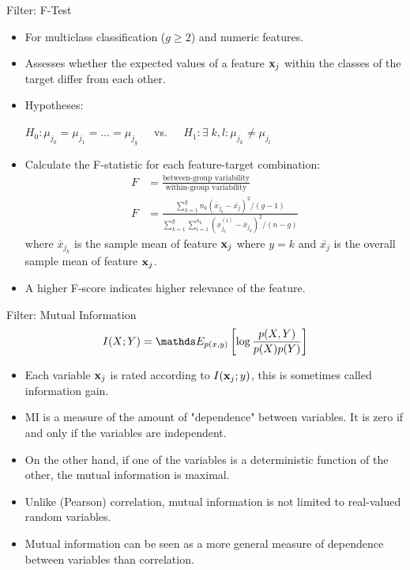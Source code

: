 \begin{vbframe}{Filter: F-Test}
\begin{itemize}
  \item For multiclass classification ($g \ge 2$) and numeric features.
  \item Assesses whether the expected values of a feature $\mathbf{x}_j$ within the classes of the target differ from each other.
  \item Hypotheses:

  $H_0: \mu_{j_0} = \mu_{j_1} = \dots = \mu_{j_g} \;\;\;\;$ vs. $\;\;\;\;H_1 : \exists \; k,l: \mu_{j_k} \neq \mu_{j_l}$
  \item Calculate the F-statistic for each feature-target combination:
  \begin{align*}
  F &= \frac{\text{between-group variability}}{\text{within-group variability}}\\
  F &= \frac{\sum_{k = 1}^g n_k (\bar{x}_{j_k} - \bar{x_j})^2/(g-1)}{\sum_{k = 1}^g \sum_{i = 1}^{n_k} (x_{j_k}^{(i)} - \bar{x}_{j_k})^2/(n-g)}
  \end{align*}
  where $\bar{x}_{j_k}$ is the sample mean of feature $\mathbf{x}_j$ where $y = k$ and $\bar{x_{j}}$ is the overall sample mean of feature $\mathbf{x}_j$.
\item A higher F-score indicates higher relevance of the feature.
\end{itemize}
\end{vbframe}

\begin{vbframe}{Filter: Mutual Information}
$$I(X ; Y) = \E_{p(x, y)} \left[ \log \frac{p(X, Y)}{p(X) p(Y)} \right]$$

\begin{itemize}
  \item Each variable $\mathbf{x}_j$ is rated according to $I(\mathbf{x}_j;y)$, this is sometimes called information gain.
  \item MI is a measure of the amount of "dependence" between variables. It is zero if and only if the variables are independent.
  \item On the other hand, if one of the variables is a deterministic function of the other, the mutual information is maximal.
 \item Unlike (Pearson) correlation, mutual information is not limited to real-valued random variables.
   \item Mutual information can be seen as a more general measure of dependence between variables than correlation.
\end{itemize}
\end{vbframe}

